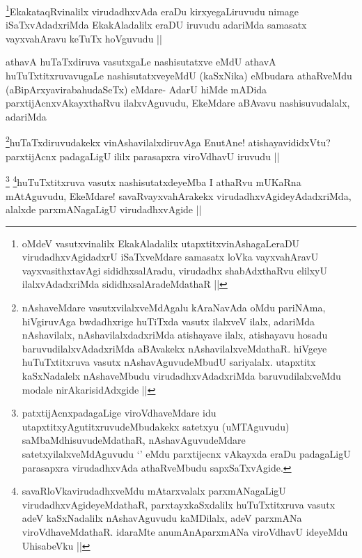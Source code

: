 \begin{artha}
\footnote{oMdeV vasutxvinalilx EkakAladalilx utapxtitxvinAshagaLeraDU virudadhxvAgidadxrU iSaTxveMdare samasatx loVka vayxvahAravU vayxvasithxtavAgi sididhxsalAradu, virudadhx shabAdxthaRvu elilxyU ilalxvAdadxriMda sididhxsalAradeMdathaR ||}EkakataqRvinalilx virudadhxvAda eraDu kirxyegaLiruvudu nimage iSaTxvAdadxriMda EkakAladalilx eraDU iruvudu adariMda samasatx vayxvahAravu keTuTx hoVguvudu ||
\end{artha}

\begin{artha}
athavA huTaTxdiruva vasutxgaLe nashisutatxve eMdU athavA huTuTxtitxruvavugaLe nashisutatxveyeMdU (kaSxNika) eMbudara athaRveMdu (aBipArxyavirabahudaSeTx) eMdare- AdarU hiMde mADida parxtijAcnxvAkayxthaRvu ilalxvAguvudu, EkeMdare aBAvavu nashisuvudalalx, adariMda
\end{artha}

\begin{artha}
\footnote{nAshaveMdare vasutxvilalxveMdAgalu kAraNavAda oMdu pariNAma, hiVgiruvAga bwdadhxrige huTiTxda vasutx ilalxveV ilalx, adariMda nAshavilalx, nAshavilalxdadxriMda atishayave ilalx, atishayavu hosadu baruvudilalxvAdadxriMda aBAvakekx nAshavilalxveMdathaR. hiVgeye huTuTxtitxruva vasutx nAshavAguvudeMbudU sariyalalx. utapxtitx kaSxNadalelx nAshaveMbudu virudadhxvAdadxriMda baruvudilalxveMdu modale nirAkarisidAdxgide ||}huTaTxdiruvudakekx vinAshavilalxdiruvAga EnutAne! atishayavididxVtu? parxtijAcnx padagaLigU ililx parasapxra viroVdhavU iruvudu ||
\end{artha}

\begin{artha}
\footnote{patxtijAcnxpadagaLige viroVdhaveMdare idu utapxtitxyAgutitxruvudeMbudakekx satetxyu (uMTAguvudu) saMbaMdhisuvudeMdathaR, nAshavAguvudeMdare satetxyilalxveMdAguvudu `\stext' eMdu parxtijecnx vAkayxda eraDu padagaLigU parasapxra virudadhxvAda athaRveMbudu sapxSaTxvAgide.}
\footnote{savaRloVkavirudadhxveMdu mAtarxvalalx parxmANagaLigU virudadhxvAgideyeMdathaR, parxtayxkaSxdalilx huTuTxtitxruva vasutx adeV kaSxNadalilx nAshavAguvudu kaMDilalx, adeV parxmANa viroVdhaveMdathaR. idaraMte anumAnAparxmANa viroVdhavU ideyeMdu UhisabeVku ||}huTuTxtitxruva vasutx nashisutatxdeyeMba I athaRvu mUKaRna mAtAguvudu, EkeMdare! savaRvayxvahArakekx virudadhxvAgideyAdadxriMda, alalxde parxmANagaLigU virudadhxvAgide ||
\end{artha}

